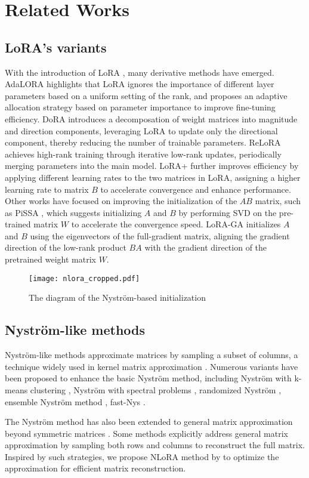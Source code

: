 \section{Related Works}

\subsection{LoRA's variants} 
With the introduction of LoRA \citep{hu2021lora}, many derivative methods have emerged. 
AdaLORA \citep{zhang2023adalora} highlights that LoRA ignores the importance of different layer parameters based on a uniform setting of the rank, and proposes an adaptive allocation strategy based on parameter importance to improve fine-tuning efficiency.
DoRA \citep{liu2024dora} introduces a decomposation of weight matrices into magnitude and direction components, leveraging LoRA to update only the directional component, thereby reducing the number of trainable parameters. ReLoRA \citep{lialin2023relora} achieves high-rank training through iterative low-rank updates, periodically merging parameters into the main model. LoRA+ \citep{hayou2024lora+} further improves efficiency by applying different learning rates to the two matrices in LoRA, assigning a higher learning rate to matrix \(B\) to accelerate convergence and enhance performance.   Other works have focused on improving the initialization of the \(AB\) matrix, such as PiSSA \citep{meng2024pissa}, which suggests initializing \(A\) and \(B\) by performing SVD on the pre-trained matrix \(W\) to accelerate the convergence speed. LoRA-GA \citep{wang2024lora} initializes \(A\) and \(B\) using the eigenvectors of the full-gradient matrix, aligning the gradient direction of the low-rank product \(BA\) with the gradient direction of the pretrained weight matrix \(W\).
\begin{figure*}[]
\centering
\texttt{[image: nlora\_cropped.pdf]} 
\caption{The diagram of the Nyström-based initialization}
\label{figure:nlora}
\end{figure*}
\subsection{Nyström-like methods}
Nyström-like methods approximate matrices by sampling a subset of columns, a technique widely used in kernel matrix approximation \citep{baker1979numerical,williams2000using}. Numerous variants have been proposed to enhance the basic Nyström method, including Nyström with k-means clustering \citep{wang2019scalable}, Nyström with spectral problems \citep{vladymyrov2016variational}, randomized Nyström \citep{li2010making,persson2024randomized}, ensemble Nyström method \citep{kumar2009ensemble}, fast-Nys \citep{si2016computationally}.

The Nyström method has also been extended to general matrix approximation beyond symmetric matrices \citep{nemtsov2016matrix}. Some methods \citep{wang2013improving,xiong2021nystromformer} explicitly address general matrix approximation by sampling both rows and columns to reconstruct the full matrix. Inspired by such strategies, we propose NLoRA method by to optimize the approximation for efficient matrix reconstruction.